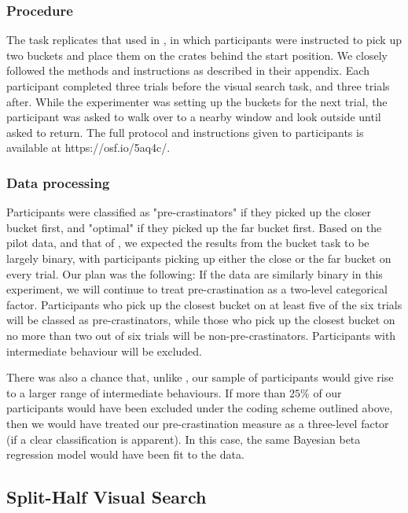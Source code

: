 \documentclass[]{rsos}
\begin{document}
\subsubsection{Procedure}

The task replicates that used in \cite{fournier2019task}, in which participants were instructed to pick up two buckets and place them on the crates behind the start position. We closely followed the methods and instructions as described in their appendix. Each participant completed three trials before the visual search task, and three trials after. While the experimenter was setting up the buckets for the next trial, the participant was asked to walk over to a nearby window and look outside until asked to return. The full protocol and instructions given to participants is available at https://osf.io/5aq4c/. 

\subsubsection{Data processing}

Participants were classified as "pre-crastinators" if they picked up the closer bucket first, and "optimal" if they picked up the far bucket first. Based on the pilot data, and that of \cite{fournier2019task}, we expected the results from the bucket task to be largely binary, with participants picking up either the close or the far bucket on every trial. Our plan was the following: If the data are similarly binary in this experiment, we will continue to treat pre-crastination as a two-level categorical factor. Participants who pick up the closest bucket on at least five of the six trials will be classed as pre-crastinators, while those who pick up the closest bucket on no more than two out of six trials will be non-pre-crastinators. Participants with intermediate behaviour will be excluded. 

There was also a chance that, unlike \cite{fournier2019task}, our sample of participants would give rise to a larger range of intermediate behaviours. If more than $25\%$ of our participants would have been excluded under the coding scheme outlined above, then we would have treated our pre-crastination measure as a three-level factor (if a clear classification is apparent). In this case, the same Bayesian beta regression model would have been fit to the data. 

\subsection{Split-Half Visual Search}
\end{document}

